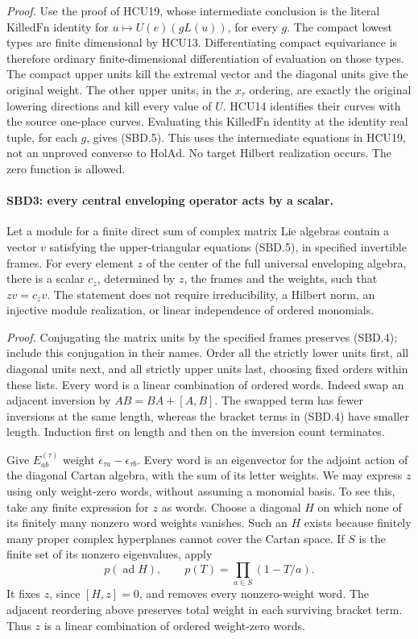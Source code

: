 \documentclass[11pt,a4paper]{article}
\numberwithin{equation}{section}
\theoremstyle{remark}\newtheorem{remark}[theorem]{Remark}
\begin{document}
\emph{Proof.}
Use the proof of HCU19, whose intermediate conclusion is the
literal \(\mathrm{KilledFn}\) identity for
\(u\mapsto U(e)(gL(u))\), for every \(g\).  The compact lowest
types are finite dimensional by HCU13.  Differentiating compact
equivariance is therefore ordinary finite-dimensional differentiation
of evaluation on those types.  The compact upper units kill the
extremal vector and the diagonal units give the original weight.
The other upper units, in the \(x_\tau\) ordering, are exactly the
original lowering directions and kill every value of \(U\).
HCU14 identifies their curves with the source one-place curves.
Evaluating this \(\mathrm{KilledFn}\) identity at the identity real
tuple, for each \(g\), gives (SBD.5).  This uses the intermediate
equations in HCU19, not an unproved converse to \(\mathrm{HolAd}\).
No target Hilbert realization occurs.  The zero function is allowed.

\paragraph{SBD3: every central enveloping operator acts by a scalar.}
\label{claim:SBD3}
Let a module for a finite direct sum of complex matrix Lie algebras
contain a vector \(v\) satisfying the upper-triangular equations
(SBD.5), in specified invertible frames.  For every element \(z\)
of the center of the full universal enveloping algebra, there is a
scalar \(c_z\), determined by \(z\), the frames and the weights,
such that \(zv=c_zv\).  The statement does not require
irreducibility, a Hilbert norm, an injective module realization, or
linear independence of ordered monomials.

\emph{Proof.}
Conjugating the matrix units by the specified frames preserves
(SBD.4); include this conjugation in their names.  Order all the
strictly lower units first, all diagonal units next, and all
strictly upper units last, choosing fixed orders within these lists.
Every word is a linear combination of ordered words.  Indeed swap
an adjacent inversion by \(AB=BA+[A,B]\).  The swapped term has
fewer inversions at the same length, whereas the bracket terms in
(SBD.4) have smaller length.  Induction first on length and then on
the inversion count terminates.

Give \(E^{(\tau)}_{ab}\) weight
\(\epsilon_{\tau a}-\epsilon_{\tau b}\).  Every word is an
eigenvector for the adjoint action of the diagonal Cartan algebra,
with the sum of its letter weights.  We may express \(z\) using
only weight-zero words, without assuming a monomial basis.  To see
this, take any finite expression for \(z\) as words.  Choose a
diagonal \(H\) on which none of its finitely many nonzero word
weights vanishes.  Such an \(H\) exists because finitely many proper
complex hyperplanes cannot cover the Cartan space.  If \(S\) is
the finite set of its nonzero eigenvalues, apply
\[
 p(\operatorname{ad}H),\qquad
 p(T)=\prod_{a\in S}(1-T/a).
 \tag{SBD.6}
\]
It fixes \(z\), since \([H,z]=0\), and removes every nonzero-weight
word.  The adjacent reordering above preserves total weight in
each surviving bracket term.  Thus \(z\) is a linear combination
of ordered weight-zero words.
\end{document}
